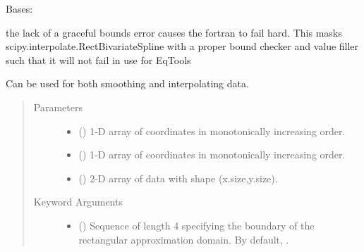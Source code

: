 \documentclass[letterpaper,10pt,english]{sphinxmanual}
\begin{document}

\begin{fulllineitems}
\label{\detokenize{eqtools:eqtools.trispline.RectBivariateSpline}}
Bases: 

the lack of a graceful bounds error causes the fortran to fail hard.
This masks scipy.interpolate.RectBivariateSpline with a proper bound
checker and value filler such that it will not fail in use for EqTools

Can be used for both smoothing and interpolating data.
\begin{quote}\begin{description}
\item[{Parameters}] \leavevmode\begin{itemize}
\item {} 
 () \textendash{} 1-D array of coordinates in monotonically increasing order.

\item {} 
 () \textendash{} 1-D array of coordinates in monotonically increasing order.

\item {} 
 () \textendash{} 2-D array of data with shape (x.size,y.size).

\end{itemize}

\item[{Keyword Arguments}] \leavevmode\begin{itemize}
\item {} 
 () \textendash{} Sequence of length 4 specifying the
boundary of the rectangular approximation domain.  By default,
.


\end{itemize}
\end{description}
\end{quote}
\end{fulllineitems}
\end{document}
